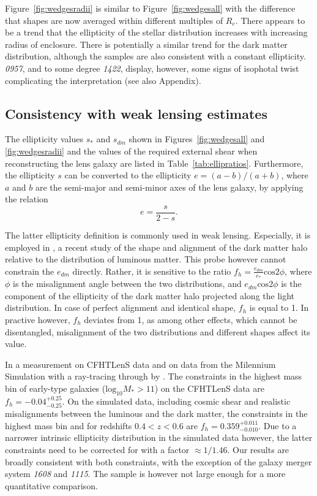 \documentclass[useAMS,usenatbib]{mn2e}
\begin{document}
Figure~\ref{fig:wedgesradii} is similar to Figure~\ref{fig:wedgesall} with the difference that shapes are now averaged within different multiples of $R_e$. There appears to be a trend that the ellipticity of the stellar distribution increases with increasing radius of enclosure. There is potentially a similar trend for the dark matter distribution, although the samples are also consistent with a constant ellipticity. {\it0957}, and to some degree {\it1422}, display, however, some signs of isophotal twist complicating the interpretation (see also Appendix).

\subsection{Consistency with weak lensing estimates}
The ellipticity values $s_{*}$ and $s_{dm}$ shown in Figures~\ref{fig:wedgesall} and \ref{fig:wedgesradii} and the values of the required external shear when reconstructing the lens galaxy are listed in Table~\ref{tab:ellipratios}. Furthermore, the ellipticity $s$ can be converted to the ellipticity $e=(a-b)/(a+b)$, where $a$ and $b$ are the semi-major and semi-minor axes of the lens galaxy, by applying the relation
\begin{equation}
   e = \frac{s}{2-s}.
\end{equation}

The latter ellipticity definition is commonly used in weak lensing. Especially, it is employed in \citet{2015arXiv150704301S}, a recent study of the shape and alignment of the dark matter halo relative to the distribution of luminous matter. This probe however cannot constrain the $e_{dm}$ directly. Rather, it is sensitive to the ratio $f_{h} = \frac{e_{dm}}{e_{*}}\mathrm{cos} 2\phi$, where $\phi$ is the misalignment angle between the two distributions, and $e_{dm}\mathrm{cos} 2\phi$ is the component of the ellipticity of the dark matter halo projected along the light distribution. In case of perfect alignment and identical shape, $f_{h}$ is equal to 1. In practive however, $f_{h}$ deviates from 1, as among other effects, which cannot be disentangled, misalignment of the two distributions and different shapes affect its value.

In \citet{2015arXiv150704301S} a measurement on CFHTLenS data and on data from the Milennium Simulation \citep{2005Natur.435..629S} with a ray-tracing through by \citet{2009A&A...499...31H}. The constraints in the highest mass bin of early-type galaxies ($\mathrm{log_{10}}M_{*}>11$) on the CFHTLenS data are $f_{h}=-0.04^{+0.25}_{-0.25}$. On the simulated data, including cosmic shear and realistic misalignments between the luminous and the dark matter, the constraints in the highest mass bin and for redshifts $0.4<z<0.6$ are $f_{h} = 0.359^{+0.011}_{-0.010}$. Due to a narrower intrinsic ellipticity distribution in the simulated data however, the latter constraints need to be corrected for with a factor $\approx 1/1.46$. Our results are broadly consistent with both constraints, with the exception of the galaxy merger system \textit{1608} and \textit{1115}. The sample is however not large enough for a more quantitative comparison.
\end{document}
